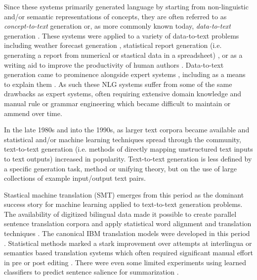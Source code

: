 Since these systems primarily generated language by starting from
non-linguistic and/or semantic representations of concepts, they are often
referred to as \textit{concept-to-text} generation or, as more commonly known
today, \textit{data-to-text} generation \citep{gatt2018survey}. These systems
were applied to a variety of data-to-text problems including weather forecast
generation \citep{goldberg1994using}, statistical report  generation (i.e.
generating a report from numerical or stastical data in a spreadsheet)
\citep{iordanskaja-etal-1992-generation}, or as a writing aid to improve the
productivity of human authors \citep{springer1991,mckeown1994,paris1995}.
Data-to-text generation came to prominence alongside expert systems
\citep{todd1992introduction}, including as a means to explain them
\citep{swartout1983xplain}.  As such these NLG systems suffer from some of the
same drawbacks as expert systems, often requiring extensive domain knowledge
and manual rule or grammar engineering which became  difficult to maintain or
ammend over time.
  
In the late 1980s and into the 1990s, as larger text corpora became available
and statistical and/or machine learning techniques spread through the
community, text-to-text generation (i.e. methods of directly mapping
unstructured text inputs to text outputs) increased in popularity.
Text-to-text generation is less defined by a specific generation task, method
or unifying theory, but on the use of large collections of example
input/output text pairs. 
  
Stastical machine translation (SMT) emerges from this period as the dominant
success story for machine learning applied to text-to-text generation problems.
The availability of digitized bilingual data made it possible to 
create parallel sentence translation corpora and
apply statistical word alignment and translation techniques \citep{gale1993}.
  The 
canonical IBM translation models were developed in this period 
\citep{brown1988,brown1993}. Statistical methods marked a stark improvement
over attempts at interlingua or semantics based translation systems 
which often required significant manual effort in pre or post editing
\citep{hutchins1994}. There were even some limited experiments using 
learned classifiers to predict sentence salience for summarization
\citep{kupiec1995trainable}.



